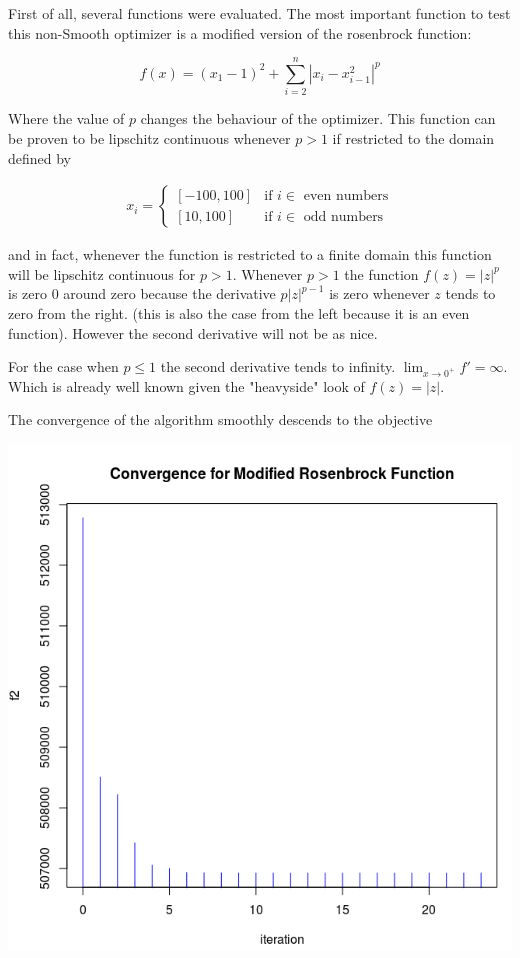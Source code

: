 First of all, several functions were evaluated. The most important function to test this non-Smooth optimizer is a modified version of the rosenbrock function:

\begin{equation}
    f(x) = (x_1 - 1)^2 + \sum_{i = 2}^n |x_i - x_{i - 1}^2|^p
\end{equation}

Where the value of $p$ changes the behaviour of the optimizer. This function can be proven to be lipschitz continuous whenever $p > 1$ if restricted to the domain defined by  

\begin{equation}
  \begin{aligned}
    x_i = 
    \begin{cases}
      [-100, 100] & \text{if } i \in \text{ even numbers} \\
      [10, 100] & \text{if } i \in \text{ odd numbers}
    \end{cases}
  \end{aligned}
\end{equation}

and in fact, whenever the function is restricted to a finite domain this function will be lipschitz continuous for $p > 1$. Whenever $p > 1$ the function $f(z) = |z|^p$ is zero $0$ around zero because the derivative $p |z| ^{p-1}$ is zero whenever $z$ tends to zero from the right. (this is also the case from the left because it is an even function). However the second derivative will not be as nice.

For the case when $p \leq 1$ the second derivative tends to infinity. $\displaystyle \lim_{x \to 0^+} {f' = \infty}$. Which is already well known given the "heavyside" look of $f(z) = |z|$.

The convergence of the algorithm smoothly descends to the objective 

\begin{center}
\includegraphics[scale=0.3]{Figures/convergence.png}
\end{center}

